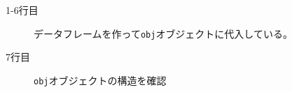 \begin{description}
	\item[1-6行目] データフレームを作って\texttt{obj}オブジェクトに代入している。
	\item[7行目] \texttt{obj}オブジェクトの構造を確認
\end{description}
